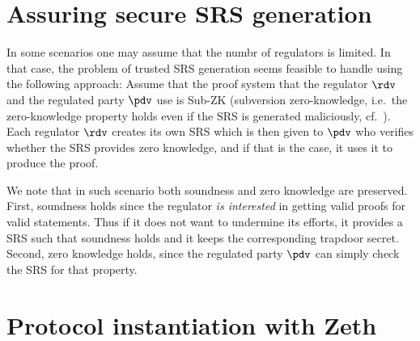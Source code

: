 \documentclass[runningheads,10pt]{llncs}
\numberwithin{equation}{section}
\begin{document}
\section{Assuring secure SRS generation}
In some scenarios one may assume that the numbr of regulators is limited. In
that case, the problem of trusted SRS generation seems feasible to handle using
the following approach: Assume that the proof system that the regulator $\rdv$
and the regulated party $\pdv$ use is Sub-ZK (subversion zero-knowledge,
i.e.~the zero-knowledge property holds even if the SRS is generated
maliciously, cf.~\cite{AC:BelFucSca16,AC:ABLZ17,PKC:Fuchsbauer18}).  Each
regulator $\rdv$ creates its own SRS which is then given to $\pdv$ who verifies
whether the SRS provides zero knowledge, and if that is the case, it uses it to
produce the proof.

We note that in such scenario both soundness and zero knowledge are preserved.
First, soundness holds since the regulator \emph{is interested} in getting
valid proofs for valid statements. Thus if it does not want to undermine its
efforts, it provides a SRS such that soundness holds and it keeps the
corresponding trapdoor secret.  Second, zero knowledge holds, since the
regulated party $\pdv$ can simply check the SRS for that property.
\section{Protocol instantiation with Zeth}

\newcommand{\genIDCreds}{\algostyle{GenIDCreds}} %
\newcommand{\genAttributeList}{\algostyle{GenAttributeList}} %
\newcommand{\genPRFKey}{\algostyle{GenPRFKey}} %
\newcommand{\pkARs}{\variable{pkARs}} %
\newcommand{\mBlind}{\variable{m_{blind}}} %
\newcommand{\sBlind}{\variable{\sigma_{blind}}} %

\end{document}
